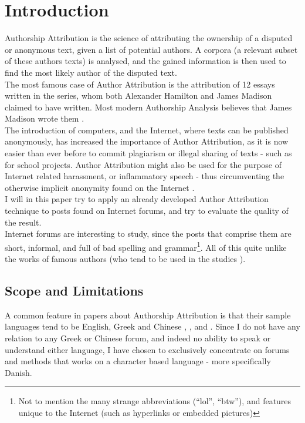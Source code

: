 \section{Introduction}
\label{introduction}
Authorship Attribution is the science of attributing the ownership of a disputed or anonymous text, given a list of potential authors. A corpora (a relevant subset of these authors texts) is analysed, and the gained information is then used to find the most likely author of the disputed text.\\

The most famous case of Author Attribution is the attribution of 12 essays written in the  series, whom both Alexander Hamilton and James Madison claimed to have written. Most modern Authorship Analysis believes that James Madison wrote them \cite{Fung03thedisputed}.\\
 The introduction of computers, and the Internet, where texts can be published anonymously, has increased the importance of Author Attribution, as it is now easier than ever before to commit plagiarism or illegal sharing of texts - such as for school projects. Author Attribution might also be used for the purpose of Internet related harassment, or inflammatory speech - thus circumventing the otherwise implicit anonymity found on the Internet .\\ 

I will in this paper try to apply an already developed Author Attribution technique to posts found on Internet forums, and try to evaluate the quality of the result.\\

Internet forums are interesting to study, since the posts that comprise them are short, informal, and full of bad spelling and grammar\footnote{Not to mention the many strange abbreviations (``lol'', ``btw''), and features unique to the Internet (such as hyperlinks or embedded pictures)}. All of this quite unlike the works of famous authors (who tend to be used in the studies \cite{nr4}). 

\subsection{Scope and Limitations}
\label{scope}
A common feature in papers about Authorship Attribution is that their sample languages tend to be English, Greek and Chinese \cite{syntactic}, \cite{nr2}, \cite{nr4} and \cite{app-spe}. Since I do not have any relation to any Greek or Chinese forum, and indeed no ability to speak or understand either language, I have chosen to exclusively concentrate on forums and methods that works on a character based language - more specifically Danish.

